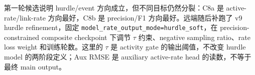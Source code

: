 \documentclass[UTF8,a4paper,11pt]{ctexart}
\newcommand{\code}[1]{\texttt{#1}}
\begin{document}
\begin{table}[H]
\centering
\small
{}
\caption{候选 v9 hurdle/event 消融结果，来源为 \code{v9\_candidate\_comparison.md}。}
\end{table}

第一轮候选说明 hurdle/event 方向成立，但不同目标仍然分裂：C8a 是 active-rate/link-rate 方向最好，C8b 是 precision/F1 方向最好。远端随后补跑了 v9 hurdle refinement，固定 \code{model\_rate\_output\_mode=hurdle\_soft}，在 precision-constrained composite checkpoint 下调节 $\tau$ 约束、negative sampling ratio、rate loss weight 和训练轮数。这里的 $\tau$ 是 activity gate 的输出阈值，不改变 hurdle model 的两阶段定义；Aux RMSE 是 auxiliary active-rate head 的读数，不等于最终 main output。
\end{document}
